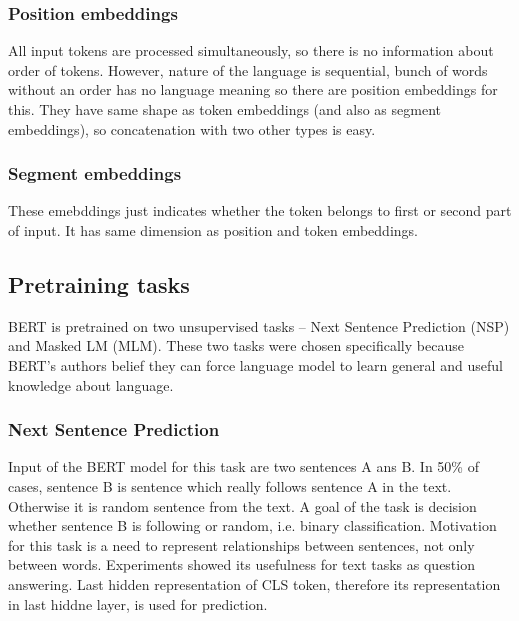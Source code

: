 \subsubsection*{Position embeddings}
All input tokens are processed simultaneously, so there is no information about order of tokens. However, nature of the language is sequential, bunch of words without an order has no language meaning so there are position embeddings for this. They have same shape as token embeddings (and also as segment embeddings), so concatenation with two other types is easy.

\subsubsection*{Segment embeddings}

These emebddings just indicates whether the token belongs to first or second part of input. It has same dimension as position and token embeddings.

\subsection{Pretraining tasks}
BERT is pretrained on two unsupervised tasks -- Next Sentence Prediction (NSP) and Masked LM (MLM). These two tasks were chosen specifically because BERT's authors belief they can force language model to learn general and useful knowledge about language. 

\subsubsection*{Next Sentence Prediction}
Input of the BERT model for this task are two sentences A ans B. In 50\% of cases, sentence B is sentence which really follows sentence A in the text. Otherwise it is random sentence from the text. A goal of the task is decision whether sentence B is following or random, i.e. binary classification. Motivation for this task is a need to represent relationships between sentences, not only between words. Experiments showed its usefulness for text tasks as question answering. Last hidden representation of CLS token, therefore its representation in last hiddne layer, is used for prediction. %

